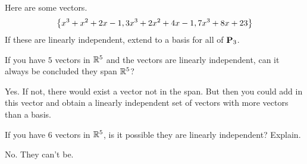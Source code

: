 \begin{ex}
  Here are some vectors.
  \begin{equation*}
    \left\{x^{3}+x^{2}+2x-1,3x^{3}+2x^{2}+4x-1,7x^{3}+8x+23\right\}
  \end{equation*}
  If these are linearly independent, extend to a basis for all of $\mathbf{P}_{3}$.
\end{ex}

\begin{ex}
  If you have $5$ vectors in $\mathbb{R}^{5}$ and the vectors are
  linearly independent, can it always be concluded they span $\mathbb{R}^{5}$?
  \begin{sol}
    Yes. If not, there would exist a vector not in the span. But then
    you could add in this vector and obtain a linearly independent set of
    vectors with more vectors than a basis.
  \end{sol}
\end{ex}

\begin{ex}
  If you have $6$ vectors in $\mathbb{R}^{5}$, is it possible they are
  linearly independent? Explain.
  \begin{sol}
    No. They can't be.
  \end{sol}
\end{ex}

